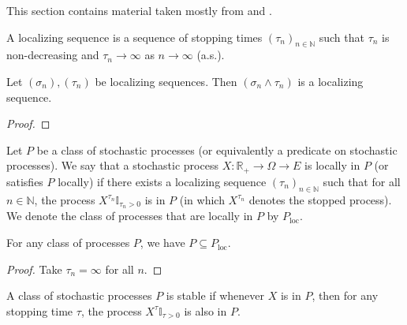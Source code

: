 This section contains material taken mostly from \cite[Chapters 10 and 18]{kallenberg2021} and \cite{almostsuremath}.


\begin{definition}\label{def:localizingSequence}
A localizing sequence is a sequence of stopping times $(\tau_n)_{n \in \mathbb{N}}$ such that $\tau_n$ is non-decreasing and $\tau_n \to \infty$ as $n \to \infty$ (a.s.).
\end{definition}


\begin{lemma}\label{lem:localizingSequence_min}
Let $(\sigma_n), (\tau_n)$ be localizing sequences.
Then $(\sigma_n \wedge \tau_n)$ is a localizing sequence.
\end{lemma}

\begin{proof}

\end{proof}


\begin{definition}\label{def:locally}
Let $P$ be a class of stochastic processes (or equivalently a predicate on stochastic processes).
We say that a stochastic process $X : \mathbb{R}_+ \to \Omega \to E$ is locally in $P$ (or satisfies $P$ locally) if there exists a localizing sequence $(\tau_n)_{n \in \mathbb{N}}$ such that for all $n \in \mathbb{N}$, the process $X^{\tau_n}\mathbb{I}_{\tau_n > 0}$ is in $P$ (in which $X^{\tau_n}$ denotes the stopped process).
We denote the class of processes that are locally in $P$ by $P_{\mathrm{loc}}$.
\end{definition}


\begin{lemma}\label{lem:implies_locally}
For any class of processes $P$, we have $P \subseteq P_{\mathrm{loc}}$.
\end{lemma}

\begin{proof}
Take $\tau_n = \infty$ for all $n$.
\end{proof}


\begin{definition}\label{def:stable}
A class of stochastic processes $P$ is stable if whenever $X$ is in $P$, then for any stopping time $\tau$, the process $X^{\tau}\mathbb{I}_{\tau > 0}$ is also in $P$.
\end{definition}


